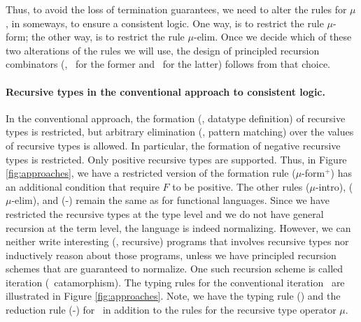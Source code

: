 Thus, to avoid the loss of termination guarantees, we need to alter the rules
for $\mu$, in someways, to ensure a consistent logic. One way, is to restrict
the rule {\small $\mu$-form}; the other way, is to restrict the rule
{\small $\mu$-elim}. Once we decide which of these two alterations of the
rules we will use, the design of principled recursion combinators (\eg, \It\
for the former and \MIt\ for the latter) follows from that choice.

\paragraph{Recursive types in the conventional approach to consistent logic.}
In the conventional approach, the formation (\ie, datatype definition) of
recursive types is restricted, but arbitrary elimination (\ie, pattern matching)
over the values of recursive types is allowed. In particular, the formation of
negative recursive types is restricted. Only positive recursive types are
supported. Thus, in Figure \ref{fig:approaches}, we have a restricted version of
the formation rule {\small($\mu$-form$^{+}$)} has an additional condition that
require $F$ to be positive. The other rules {\small($\mu$-intro)},
{\small($\mu$-elim)}, and {\small(\unIn-\In)} remain the same as for
functional languages. Since we have restricted the recursive types
at the type level and we do not have general recursion at the term level,
the language is indeed normalizing. However, we can neither write
interesting (\ie, recursive) programs that involves recursive types nor
inductively reason about those programs, unless we have principled recursion
schemes that are guaranteed to normalize. One such recursion scheme is called
iteration (\aka\ catamorphism). The typing rules for the conventional iteration
\It\ are illustrated in Figure \ref{fig:approaches}. Note, we have the typing
rule {\small(\It)} and the reduction rule {\small(\It-\In)} for \It\,
in addition to the rules for the recursive type operator $\mu$.

